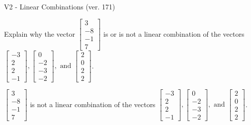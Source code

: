 \begin{exercise}
  \begin{exerciseTitle}V2 - Linear Combinations (ver. 171)\end{exerciseTitle}
  \begin{exerciseStatement}
    Explain why the vector \(\left[\begin{array}{c}
3 \\
-8 \\
-1 \\
7
\end{array}\right]\)  is or is not a linear 
	combination of the vectors \(\left[\begin{array}{c}
-3 \\
2 \\
2 \\
-1
\end{array}\right] , \left[\begin{array}{c}
0 \\
-2 \\
-3 \\
-2
\end{array}\right] , \text{ and } \left[\begin{array}{c}
2 \\
0 \\
2 \\
2
\end{array}\right]\).
	


  \end{exerciseStatement}
  \begin{exerciseAnswer}
   \(\left[\begin{array}{c}
3 \\
-8 \\
-1 \\
7
\end{array}\right]\) 
  	 is not  
	a linear combination of the vectors \(\left[\begin{array}{c}
-3 \\
2 \\
2 \\
-1
\end{array}\right] , \left[\begin{array}{c}
0 \\
-2 \\
-3 \\
-2
\end{array}\right] , \text{ and } \left[\begin{array}{c}
2 \\
0 \\
2 \\
2
\end{array}\right]\).

	
  


  \end{exerciseAnswer}
\end{exercise}